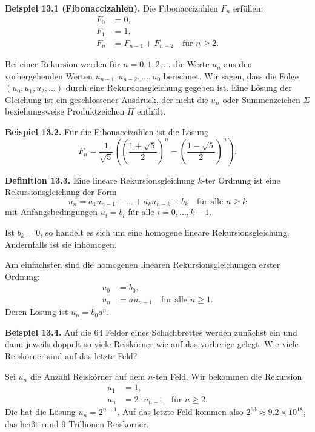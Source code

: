 \documentclass[9pt]{article}
\begin{document}
\textbf{Beispiel 13.1 (Fibonaccizahlen).} Die Fibonaccizahlen $F_n$ erfüllen:
\begin{align*}
    F_0 &= 0, \\
    F_1 &= 1, \\
    F_n &= F_{n-1} + F_{n-2} \quad \text{für } n \geq 2.
\end{align*}

Bei einer Rekursion werden für $n = 0, 1, 2, \dots$ die Werte $u_n$ aus den vorhergehenden Werten $u_{n-1}, u_{n-2}, \dots, u_0$ berechnet. Wir sagen, dass die Folge $(u_0, u_1, u_2, \dots)$ durch eine Rekursionsgleichung gegeben ist. Eine Lösung der Gleichung ist ein geschlossener Ausdruck, der nicht die $u_n$ oder Summenzeichen $\Sigma$ beziehungsweise Produktzeichen $\Pi$ enthält.

\textbf{Beispiel 13.2.} Für die Fibonaccizahlen ist die Lösung
\begin{equation*}
    F_n = \frac{1}{\sqrt{5}} \left( \left(\frac{1 + \sqrt{5}}{2}\right)^n - \left(\frac{1 - \sqrt{5}}{2}\right)^n \right).
\end{equation*}

\textbf{Definition 13.3.} Eine lineare Rekursionsgleichung $k$-ter Ordnung ist eine Rekursionsgleichung der Form
\begin{equation*}
    u_n = a_1 u_{n-1} + \dots + a_k u_{n-k} + b_k \quad \text{für alle } n \geq k
\end{equation*}
mit Anfangsbedingungen $u_i = b_i$ für alle $i = 0, \dots, k - 1$.

Ist $b_k = 0$, so handelt es sich um eine homogene lineare Rekursionsgleichung. Andernfalls ist sie inhomogen.

Am einfachsten sind die homogenen linearen Rekursionsgleichungen erster Ordnung:
\begin{align*}
    u_0 &= b_0, \\
    u_n &= a u_{n-1} \quad \text{für alle } n \geq 1.
\end{align*}
Deren Lösung ist $u_n = b_0 a^n$.

\textbf{Beispiel 13.4.} Auf die 64 Felder eines Schachbrettes werden zunächst ein und dann jeweils doppelt so viele Reiskörner wie auf das vorherige gelegt. Wie viele Reiskörner sind auf das letzte Feld?

Sei $u_n$ die Anzahl Reiskörner auf dem $n$-ten Feld. Wir bekommen die Rekursion
\begin{align*}
    u_1 &= 1, \\
    u_n &= 2 \cdot u_{n-1} \quad \text{für } n \geq 2.
\end{align*}
Die hat die Lösung $u_n = 2^{n-1}$. Auf das letzte Feld kommen also $2^{63} \approx 9.2 \times 10^{18}$, das heißt rund 9 Trillionen Reiskörner.
\end{document}
